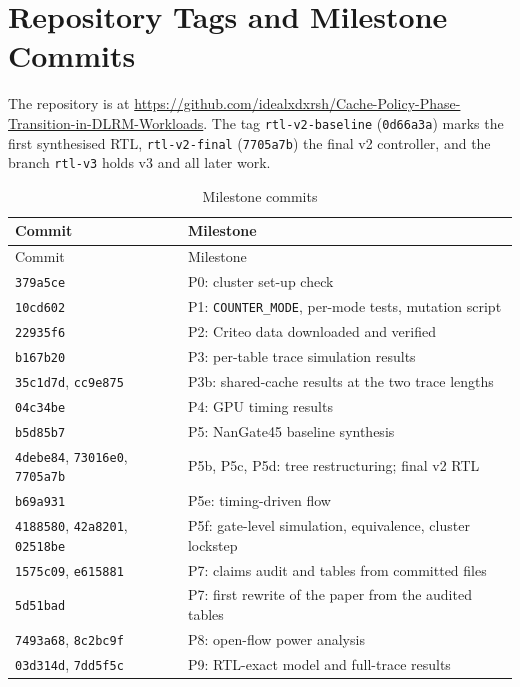 \documentclass[11pt,a4paper]{report}
\begin{document}
\chapter{Repository Tags and Milestone Commits}\label{app:commits}
The repository is at \url{https://github.com/idealxdxrsh/Cache-Policy-Phase-Transition-in-DLRM-Workloads}. The tag
\texttt{rtl-v2-baseline} (\texttt{0d66a3a}) marks the first synthesised RTL, \texttt{rtl-v2-final}
(\texttt{7705a7b}) the final v2 controller, and the branch \texttt{rtl-v3} holds v3 and all later work.

\begin{small}
\begin{longtable}{@{}>{\raggedright\arraybackslash}p{}>{\raggedright\arraybackslash}p{}@{}}
\caption{Milestone commits}\label{tab:commits}\\
\toprule
Commit & Milestone \\
\midrule
\endfirsthead
\toprule
Commit & Milestone \\
\midrule
\endhead
\texttt{379a5ce} & P0: cluster set-up check \\
\texttt{10cd602} & P1: \texttt{COUNTER\_MODE}, per-mode tests, mutation script \\
\texttt{22935f6} & P2: Criteo data downloaded and verified \\
\texttt{b167b20} & P3: per-table trace simulation results \\
\texttt{35c1d7d}, \texttt{cc9e875} & P3b: shared-cache results at the two trace lengths \\
\texttt{04c34be} & P4: GPU timing results \\
\texttt{b5d85b7} & P5: NanGate45 baseline synthesis \\
\texttt{4debe84}, \texttt{73016e0}, \texttt{7705a7b} & P5b, P5c, P5d: tree restructuring; final v2 RTL \\
\texttt{b69a931} & P5e: timing-driven flow \\
\texttt{4188580}, \texttt{42a8201}, \texttt{02518be} & P5f: gate-level simulation, equivalence, cluster lockstep \\
\texttt{1575c09}, \texttt{e615881} & P7: claims audit and tables from committed files \\
\texttt{5d51bad} & P7: first rewrite of the paper from the audited tables \\
\texttt{7493a68}, \texttt{8c2bc9f} & P8: open-flow power analysis \\
\texttt{03d314d}, \texttt{7dd5f5c} & P9: RTL-exact model and full-trace results \\

\end{longtable}
\end{small}
\end{document}
